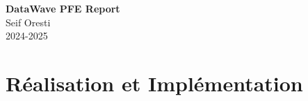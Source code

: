 \documentclass[]{./tpl/isipfe}
\begin{document}
    
    
    \frontmatter
        \begin{center}
        \Large\textbf{DataWave PFE Report}\\
        \large Seif Oresti\\
        2024-2025
        \end{center}
        \clearpage
        
        \tableofcontents
        \clearpage
    
    \mainmatter
        
        \clearpage
        
        
        \clearpage
        
        
        \clearpage
        
        \chapter{Réalisation et Implémentation}
        
        \clearpage
        
        \clearpage
        
        \clearpage
        
        
        \clearpage
        
        
        \clearpage
\end{document}
